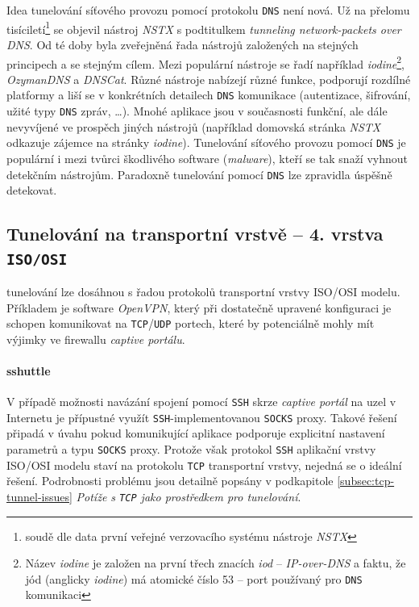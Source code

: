 \documentclass[thesis=M,czech]{FITthesis}[2012/10/20]
\begin{document}
Idea tunelování síťového provozu pomocí protokolu \texttt{DNS} není nová. Už na přelomu tisíciletí\footnote{soudě dle data první veřejné verzovacího systému nástroje \textit{NSTX}} se objevil nástroj \textit{NSTX} s podtitulkem \textit{tunneling network-packets over DNS}. Od té doby byla zveřejněná řada nástrojů založených na stejných principech a se stejným cílem. Mezi populární\cite{sans-dns-tunels} nástroje se řadí například \textit{iodine}\footnote{Název \textit{iodine} je založen na první třech znacích \textit{iod} -- \textit{IP-over-DNS} a faktu, že jód (anglicky \textit{iodine}) má atomické číslo 53 -- port používaný pro \texttt{DNS} komunikaci}, \textit{OzymanDNS} a \textit{DNSCat}. Různé nástroje nabízejí různé funkce, podporují rozdílné platformy a liší se v konkrétních detailech \texttt{DNS} komunikace (autentizace, šifrování, užité typy \texttt{DNS} zpráv, \ldots). Mnohé aplikace jsou v současnosti funkční, ale dále nevyvíjené ve prospěch jiných nástrojů (například domovská stránka \textit{NSTX} odkazuje zájemce na stránky \textit{iodine}). Tunelování síťového provozu pomocí \texttt{DNS} je populární\cite{sans-dns-tunels} i mezi tvůrci škodlivého software (\textit{malware}), kteří se tak snaží vyhnout detekčním nástrojům. Paradoxně tunelování pomocí \texttt{DNS} lze zpravidla úspěšně detekovat\cite{bakalarka-detekce-tunelu}.


\subsection{Tunelování na transportní vrstvě -- 4. vrstva \texttt{ISO/OSI}}

 tunelování lze dosáhnou s řadou protokolů transportní vrstvy ISO/OSI modelu. Příkladem je software \textit{OpenVPN}, který při dostatečně upravené konfiguraci je schopen komunikovat na \texttt{TCP}/\texttt{UDP} portech, které by potenciálně mohly mít výjimky ve firewallu \textit{captive portálu}.

\paragraph{sshuttle}

V případě možnosti navázání spojení pomocí \texttt{SSH} skrze \textit{captive portál} na uzel v Internetu je přípustné využít \texttt{SSH}-implementovanou \texttt{SOCKS} proxy. Takové řešení připadá v úvahu pokud komunikující aplikace podporuje explicitní nastavení parametrů a typu \texttt{SOCKS} proxy. Protože však protokol \texttt{SSH} aplikační vrstvy ISO/OSI modelu staví na protokolu \texttt{TCP} transportní vrstvy, nejedná se o ideální řešení. Podrobnosti problému jsou detailně popsány v podkapitole \ref{subsec:tcp-tunnel-issues} \textit{Potíže s \texttt{TCP} jako prostředkem pro tunelování}.
\end{document}
